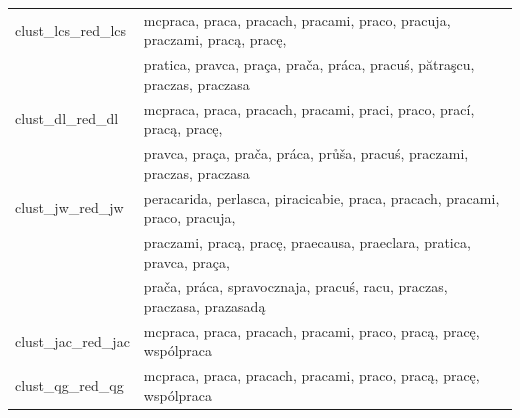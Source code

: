 \documentclass{praca1}
\begin{document}
\begin{table}[!h]
\begin{tabular}{|l|l|}
   \hline
clust\_lcs\_red\_lcs & mcpraca, praca, pracach, pracami, praco, pracuja, praczami, pracą, pracę,  \\ & pratica, pravca, praça, prača, práca, pracuś, pătraşcu, praczas, praczasa \\ 
   \hline
clust\_dl\_red\_dl & mcpraca, praca, pracach, pracami, praci, praco, prací, pracą, pracę,  \\ & pravca, praça, prača, práca, průša, pracuś, praczami, praczas, praczasa \\ 
   \hline
clust\_jw\_red\_jw & peracarida, perlasca, piracicabie, praca, pracach, pracami, praco, pracuja,  \\ & praczami, pracą, pracę, praecausa, praeclara, pratica, pravca, praça, \\ &  prača, práca, spravocznaja, pracuś, racu, praczas, praczasa, prazasadą \\ 
   \hline
clust\_jac\_red\_jac & mcpraca, praca, pracach, pracami, praco, pracą, pracę, wspólpraca \\ 
   \hline
clust\_qg\_red\_qg & mcpraca, praca, pracach, pracami, praco, pracą, pracę, wspólpraca \\ 
   \hline
\end{tabular}
\label{tab:006}
\end{table}
\end{document}
